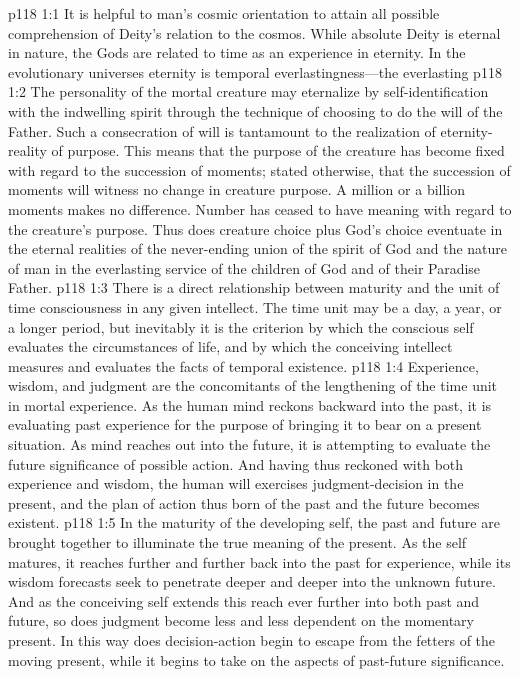 \vs p118 1:1 It is helpful to man’s cosmic orientation to attain all possible comprehension of Deity’s relation to the cosmos. While absolute Deity is eternal in nature, the Gods are related to time as an experience in eternity. In the evolutionary universes eternity is temporal everlastingness---the everlasting \plusone
\pc \vs p118 1:2 The personality of the mortal creature may eternalize by self\hyp{}identification with the indwelling spirit through the technique of choosing to do the will of the Father. Such a consecration of will is tantamount to the realization of eternity\hyp{}reality of purpose. This means that the purpose of the creature has become fixed with regard to the succession of moments; stated otherwise, that the succession of moments will witness no change in creature purpose. A million or a billion moments makes no difference. Number has ceased to have meaning with regard to the creature’s purpose. Thus does creature choice plus God’s choice eventuate in the eternal realities of the never\hyp{}ending union of the spirit of God and the nature of man in the everlasting service of the children of God and of their Paradise Father.
\vs p118 1:3 There is a direct relationship between maturity and the unit of time consciousness in any given intellect. The time unit may be a day, a year, or a longer period, but inevitably it is the criterion by which the conscious self evaluates the circumstances of life, and by which the conceiving intellect measures and evaluates the facts of temporal existence.
\vs p118 1:4 Experience, wisdom, and judgment are the concomitants of the lengthening of the time unit in mortal experience. As the human mind reckons backward into the past, it is evaluating past experience for the purpose of bringing it to bear on a present situation. As mind reaches out into the future, it is attempting to evaluate the future significance of possible action. And having thus reckoned with both experience and wisdom, the human will exercises judgment\hyp{}decision in the present, and the plan of action thus born of the past and the future becomes existent.
\vs p118 1:5 In the maturity of the developing self, the past and future are brought together to illuminate the true meaning of the present. As the self matures, it reaches further and further back into the past for experience, while its wisdom forecasts seek to penetrate deeper and deeper into the unknown future. And as the conceiving self extends this reach ever further into both past and future, so does judgment become less and less dependent on the momentary present. In this way does decision\hyp{}action begin to escape from the fetters of the moving present, while it begins to take on the aspects of past\hyp{}future significance.
